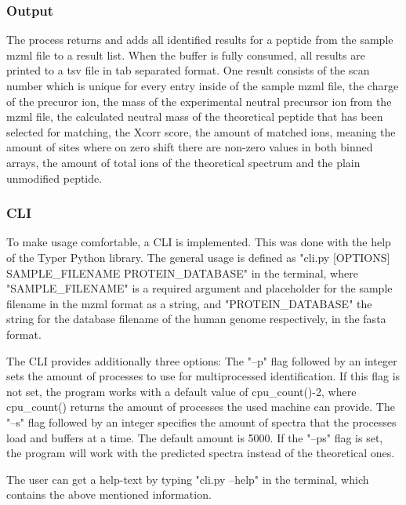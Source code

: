 \documentclass[11pt]{article}
\begin{document}
\subsubsection{Output}
The process returns and adds all identified results for a peptide from the sample mzml file to a result list. When the buffer is fully consumed, all results are printed to a tsv file in tab separated format. One result consists of the scan number which is unique for every entry inside of the sample mzml file, the charge of the precuror ion, the mass of the experimental neutral precursor ion from the mzml file, the calculated neutral mass of the theoretical peptide that has been selected for matching, the Xcorr score, the amount of matched ions, meaning the amount of sites where on zero shift there are non-zero values in both binned arrays, the amount of total ions of the theoretical spectrum and the plain unmodified peptide.

\subsubsection{CLI}
To make usage comfortable, a CLI is implemented. This was done with the help of the Typer Python library. The general usage is defined as "cli.py [OPTIONS] SAMPLE\_FILENAME PROTEIN\_DATABASE" in the terminal, where "SAMPLE\_FILENAME" is a required argument and placeholder for the sample filename in the mzml format as a string, and "PROTEIN\_DATABASE" the string for the database filename of the human genome respectively, in the fasta format. 

The CLI provides additionally three options: The "--p" flag followed by an integer sets the amount of processes to use for multiprocessed identification. If this flag is not set, the program works with a default value of cpu\_count()-2, where cpu\_count() returns the amount of processes the used machine can provide. The "--s" flag followed by an integer specifies the amount of spectra that the processes load and buffers at a time. The default amount is 5000. If the "--ps" flag is set, the program will work with the predicted spectra instead of the theoretical ones.

The user can get a help-text by typing "cli.py --help" in the terminal, which contains the above mentioned information.
\end{document}
